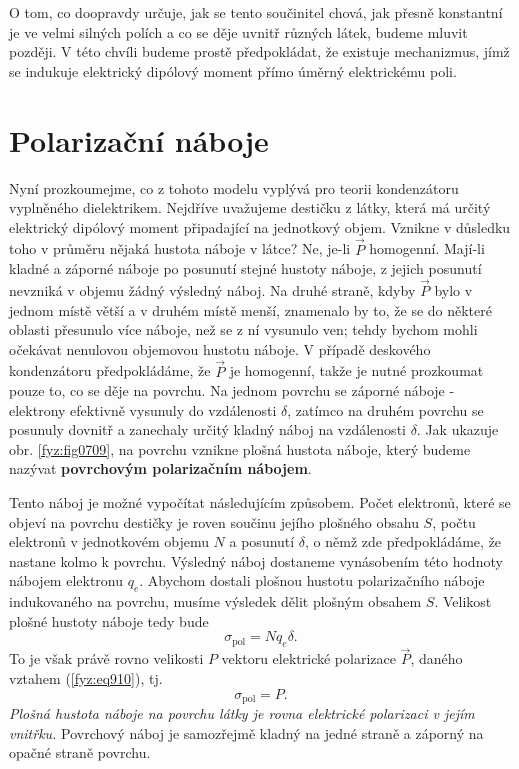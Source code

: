     O tom, co doopravdy určuje, jak se tento součinitel chová, jak přesně konstantní je ve velmi
    silných polích a co se děje uvnitř různých látek, budeme mluvit později. V této chvíli budeme
    prostě předpokládat, že existuje mechanizmus, jímž se indukuje elektrický dipólový moment přímo
    úměrný elektrickému poli.

  \section{Polarizační náboje}\label{fyz:IIchapXsecIII}   
    Nyní prozkoumejme, co z tohoto modelu vyplývá pro teorii kondenzátoru vyplněného dielektrikem.
    Nejdříve uvažujeme destičku z látky, která má určitý elektrický dipólový moment připadající na
    jednotkový objem. Vznikne v důsledku toho v průměru nějaká hustota náboje v látce? Ne, je-li
    \(\vec{P}\) homogenní. Mají-li kladné a záporné náboje po posunutí stejné hustoty náboje, z
    jejich posunutí nevzniká v objemu žádný výsledný náboj. Na druhé straně, kdyby \(\vec{P}\) bylo
    v jednom místě větší a v druhém místě menší, znamenalo by to, že se do některé oblasti přesunulo
    více náboje, než se z ní vysunulo ven; tehdy bychom mohli očekávat nenulovou objemovou hustotu
    náboje. V případě deskového kondenzátoru předpokládáme, že \(\vec{P}\) je homogenní, takže je
    nutné prozkoumat pouze to, co se děje na povrchu. Na jednom povrchu se záporné náboje -
    elektrony efektivně vysunuly do vzdálenosti \(δ\), zatímco na druhém povrchu se posunuly dovnitř
    a zanechaly určitý kladný náboj na vzdálenosti \(δ\). Jak ukazuje obr. \ref{fyz:fig0709}, na
    povrchu vznikne plošná hustota náboje, který budeme nazývat \textbf{povrchovým polarizačním
    nábojem}.

    Tento náboj je možné vypočítat následujícím způsobem. Počet elektronů, které se objeví na
    povrchu destičky je roven součinu jejího plošného obsahu \(S\), počtu elektronů v jednotkovém
    objemu \(N\) a posunutí \(δ\), o němž zde předpokládáme, že nastane kolmo k povrchu. Výsledný
    náboj dostaneme vynásobením této hodnoty nábojem elektronu \(q_e\). Abychom dostali plošnou
    hustotu polarizačního náboje indukovaného na povrchu, musíme výsledek dělit plošným obsahem
    \(S\). Velikost plošné hustoty náboje tedy bude
    \begin{equation*}
      σ_{\text{pol}}=Nq_eδ.
    \end{equation*}
    To je však právě rovno velikosti \(P\) vektoru elektrické polarizace \(\vec{P}\), daného vztahem
    (\ref{fyz:eq910}), tj. 
    \begin{equation}\label{fyz:eq911}
      σ_{\text{pol}} = P.
    \end{equation}
    \emph{Plošná hustota náboje na povrchu látky je rovna elektrické polarizaci v jejím vnitřku.}
    Povrchový náboj je samozřejmě kladný na jedné straně a záporný na opačné straně povrchu.

